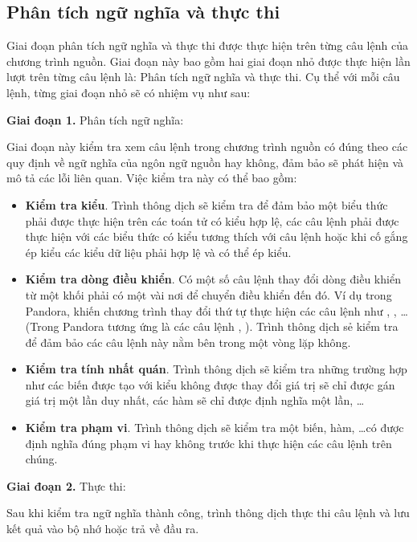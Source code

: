 \subsection{Phân tích ngữ nghĩa và thực thi}

Giai đoạn phân tích ngữ nghĩa và thực thi được thực hiện trên từng câu lệnh của chương trình nguồn. Giai đoạn này bao gồm hai giai đoạn nhỏ được thực hiện lần lượt trên từng câu lệnh là: Phân tích ngữ nghĩa và thực thi. Cụ thể với mỗi câu lệnh, từng giai đoạn nhỏ sẽ có nhiệm vụ như sau:

\textbf{Giai đoạn 1.} Phân tích ngữ nghĩa: 

Giai đoạn này kiểm tra xem câu lệnh trong chương trình nguồn có đúng theo các quy định về ngữ nghĩa của ngôn ngữ nguồn hay không, đảm bảo sẽ phát hiện và mô tả các lỗi liên quan. Việc kiểm tra này có thể bao gồm: 
\label{ch1:semantic}
\begin{itemize}
    \item \textbf{Kiểm tra kiểu}. Trình thông dịch sẽ kiểm tra để đảm bảo một biểu thức phải được thực hiện trên các toán tử có kiểu hợp lệ, các câu lệnh phải được thực hiện với các biểu thức có kiểu tương thích với câu lệnh hoặc khi cố gắng ép kiểu các kiểu dữ liệu phải hợp lệ và có thể ép kiểu.
    \item \textbf{Kiểm tra dòng điều khiển}. Có một số câu lệnh thay đổi dòng điều khiển từ một khối phải có một vài nơi để chuyển điều khiển đến đó. Ví dụ trong Pandora, khiến chương trình thay đổi thứ tự thực hiện các câu lệnh như  , , \dots (Trong Pandora tương ứng là các câu lệnh , ). Trình thông dịch sẻ kiểm tra để đảm bảo các câu lệnh này nằm bên trong một vòng lặp không.
    \item \textbf{Kiểm tra tính nhất quán}. Trình thông dịch sẽ kiểm tra những trường hợp như các biến được tạo với kiểu không được thay đổi giá trị sẽ chỉ được gán giá trị một lần duy nhất, các hàm sẽ chỉ được định nghĩa một lần, \dots
    \item \textbf{Kiểm tra phạm vi}. Trình thông dịch sẽ kiểm tra một biến, hàm, \dots có được định nghĩa đúng phạm vi hay không trước khi thực hiện các câu lệnh trên chúng.
\end{itemize}

\textbf{Giai đoạn 2.} Thực thi: 

Sau khi kiểm tra ngữ nghĩa thành công, trình thông dịch thực thi câu lệnh và lưu kết quả vào bộ nhớ hoặc trả về đầu ra.